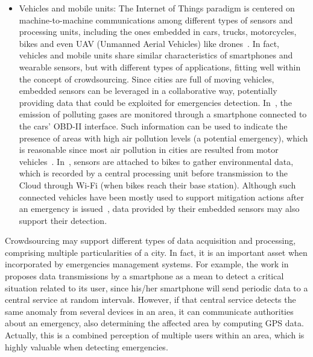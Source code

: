 \begin{refsection}
\begin{itemize}
  \item Vehicles and mobile units: The Internet of Things paradigm is centered on machine-to-machine communications among different types of sensors and processing units, including the ones embedded in cars, trucks, motorcycles, bikes and even UAV (Unmanned Aerial Vehicles) like drones~\cite{iotsurvey,SurveyIoT}. In fact, vehicles and mobile units share similar characteristics of smartphones and wearable sensors, but with different types of applications, fitting well within the concept of crowdsourcing. Since cities are full of moving vehicles, embedded sensors can be leveraged in a collaborative way, potentially providing data that could be exploited for emergencies detection. In~\cite{carpollution}, the emission of polluting gases are monitored through a smartphone connected to the cars' OBD-II interface. Such information can be used to indicate the presence of areas with high air pollution levels (a potential emergency), which is reasonable since most air pollution in cities are resulted from motor vehicles~\cite{pollutioncities1}. In~\cite{iotBike1}, sensors are attached to bikes to gather environmental data, which is recorded by a central processing unit before transmission to the Cloud through Wi-Fi (when bikes reach their base station). Although such connected vehicles have been mostly used to support mitigation actions after an emergency is issued~\cite{mitigationDrone1,mitigationDrone2,mitigationITS1}, data provided by their embedded sensors may also support their detection.
\end{itemize}

Crowdsourcing may support different types of data acquisition and processing, comprising multiple particularities of a city. In fact, it is an important asset when incorporated by emergencies management systems. For example, the work in~\cite{crowdsourcing4} proposes data transmissions by a smartphone as a mean to detect a critical situation related to its user, since his/her smartphone will send periodic data to a central service at random intervals. However, if that central service detects the same anomaly from several devices in an area, it can communicate authorities about an emergency, also determining the affected area by computing GPS data. Actually, this is a combined perception of multiple users within an area, which is highly valuable when detecting emergencies.


\end{refsection}
